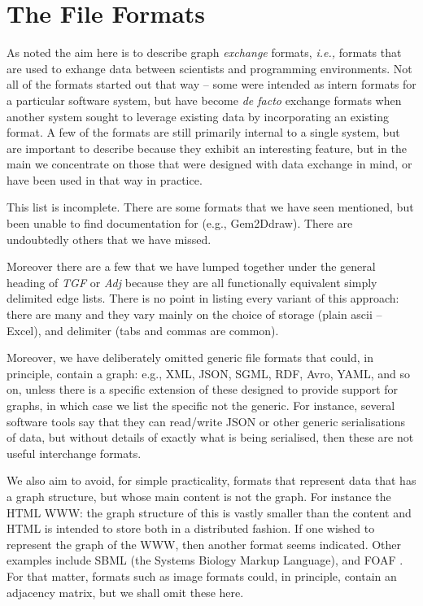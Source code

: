 \documentclass{sig-alternate}
\newcommand{\ie}{{\em i.e., }}
\begin{document}
\section{The File Formats}

As noted the aim here is to describe graph {\em exchange} formats, \ie
formats that are used to exhange data between scientists and
programming environments. Not all of the formats started out that way
-- some were intended as intern formats for a particular software
system, but have become {\em de facto} exchange formats when another
system sought to leverage existing data by incorporating an existing
format. A few of the formats are still primarily internal to a single
system, but are important to describe because they exhibit an
interesting feature, but in the main we concentrate on those that were
designed with data exchange in mind, or have been used in that way in
practice. 

This list is incomplete. There are some formats that we have seen
mentioned, but been unable to find documentation for (e.g.,
Gem2Ddraw). There are undoubtedly others that we have missed.

Moreover there are a few that we have lumped together under the
general heading of {\em TGF} or {\em Adj} because they are all
functionally equivalent simply delimited edge lists. There is no point
in listing every variant of this approach: there are many and they
vary mainly on the choice of storage (plain ascii -- Excel), and
delimiter (tabs and commas are common).

Moreover, we have deliberately omitted generic file formats that
could, in principle, contain a graph: e.g., XML, JSON, SGML, RDF,
Avro, YAML, and so on, unless there is a specific extension of these
designed to provide support for graphs, in which case we list the
specific not the generic. For instance, several software tools say
that they can read/write JSON or other generic serialisations of data,
but without details of exactly what is being serialised, then these
are not useful interchange formats.

We also aim to avoid, for simple practicality, formats that represent
data that has a graph structure, but whose main content is not the
graph. For instance the HTML WWW: the graph structure of this is
vastly smaller than the content and HTML is intended to store both in
a distributed fashion. If one wished to represent the graph of the
WWW, then another format seems indicated. Other examples include SBML
(the Systems Biology Markup Language), and FOAF \cite{foaf}. For that
matter, formats such as image formats could, in principle, contain an
adjacency matrix, but we shall omit these here. 
\end{document}
